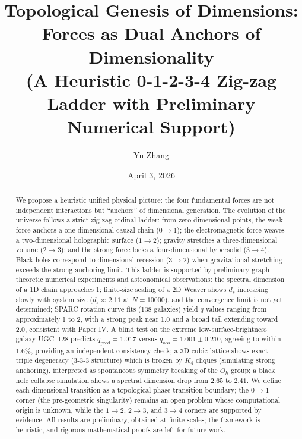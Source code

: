 \documentclass[12pt,a4paper]{article}
\title{Topological Genesis of Dimensions: Forces as Dual Anchors of Dimensionality\\
\large (A Heuristic 0-1-2-3-4 Zig-zag Ladder with Preliminary Numerical Support)}
\author{Yu Zhang}
\date{April 3, 2026}
\begin{document}
\maketitle

\begin{abstract}
We propose a heuristic unified physical picture: the four fundamental forces are not independent interactions but ``anchors'' of dimensional generation. The evolution of the universe follows a strict zig-zag ordinal ladder: from zero-dimensional points, the weak force anchors a one-dimensional causal chain ($0\to1$); the electromagnetic force weaves a two-dimensional holographic surface ($1\to2$); gravity stretches a three-dimensional volume ($2\to3$); and the strong force locks a four-dimensional hypersolid ($3\to4$). Black holes correspond to dimensional recession ($3\to2$) when gravitational stretching exceeds the strong anchoring limit. This ladder is supported by preliminary graph-theoretic numerical experiments and astronomical observations: the spectral dimension of a 1D chain approaches 1; finite-size scaling of a 2D Weaver shows $d_s$ increasing slowly with system size ($d_s\approx2.11$ at $N=10000$), and the convergence limit is not yet determined; SPARC rotation curve fits (138 galaxies) yield $q$ values ranging from approximately 1 to 2, with a strong peak near 1.0 and a broad tail extending toward 2.0, consistent with Paper IV. A blind test on the extreme low-surface-brightness galaxy UGC~128 predicts $q_{\text{pred}}=1.017$ versus $q_{\text{obs}}=1.001\pm0.210$, agreeing to within $1.6\%$, providing an independent consistency check; a 3D cubic lattice shows exact triple degeneracy ($3$-$3$-$3$ structure) which is broken by $K_4$ cliques (simulating strong anchoring), interpreted as spontaneous symmetry breaking of the $O_h$ group; a black hole collapse simulation shows a spectral dimension drop from $2.65$ to $2.41$. We define each dimensional transition as a topological phase transition boundary; the $0\to1$ corner (the pre-geometric singularity) remains an open problem whose computational origin is unknown, while the $1\to2$, $2\to3$, and $3\to4$ corners are supported by evidence. All results are preliminary, obtained at finite scales; the framework is heuristic, and rigorous mathematical proofs are left for future work.
\end{abstract}
\end{document}
